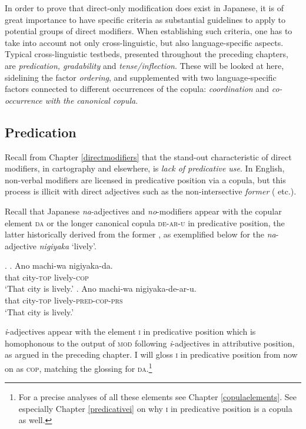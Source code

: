\documentclass [output=book,colorlinks,citecolor=brown]{langscibook}
\begin{document}
In order to prove that direct-only modification does exist in Japanese, it is of great importance to have specific criteria as substantial guidelines to apply to potential groups of direct modifiers. When establishing such criteria, one has to take into account not only cross-linguistic, but also language-specific aspects. Typical cross-linguistic testbeds, presented throughout the preceding chapters, are \textit{predication, gradability} and \textit{tense/inflection}. These will be looked at here, sidelining the factor \textit{ordering}, and supplemented with two language-specific factors connected to different occurrences of the copula: \textit{coordination} and \textit{co-occurrence with the canonical copula}.

\subsection{Predication} \label{test predication}

Recall from Chapter \ref{directmodifiers} that the stand-out characteristic of direct modifiers, in cartography and elsewhere, is \textit{lack of predicative use}. In English, non-verbal modifiers are licensed in predicative position via a copula, but this process is illicit with direct adjectives such as the non-intersective \textit{former} (\citealt{siegel:1976:capturing, larson:1998:events, cinque:2010:adj, cinque:2014:semantics} etc.).

Recall that Japanese \textit{na}-adjectives and \textit{no}-modifiers appear with the copular element \textsc{da} or the longer canonical copula \textsc{de-ar-u} in predicative position, the latter historically derived from the former \citep{urushibara:1993:syntactic, nishiyama:1999:adj, nakahara:2002:japanese, frellesvig:2010:history, miyama:2011:da}, as exemplified below for the \textit{na}-adjective \textit{nigiyaka} `lively’. %

\newpage

\ex. \ag. Ano machi-wa nigiyaka-da.\\
that city-\textsc{top} lively-\textsc{cop}\\
`That city is lively.’
\bg. Ano machi-wa nigiyaka-de-ar-u.\\
that city-\textsc{top} lively-\textsc{pred-cop-prs}\\
`That city is lively.’

\textit{i}-adjectives appear with the element \textsc{i} in predicative position which is homophonous to the output of \textsc{mod} following \textit{i}-adjectives in attributive position, as argued in the preceding chapter. I will gloss \textsc{i} in predicative position from now on as \textsc{cop}, matching the glossing for \textsc{da}.\footnote{For a precise analyses of all these elements see Chapter \ref{copulaelements}. See especially Chapter \ref{predicativei} on why \textsc{i} in predicative position is a copula as well.}
\end{document}
